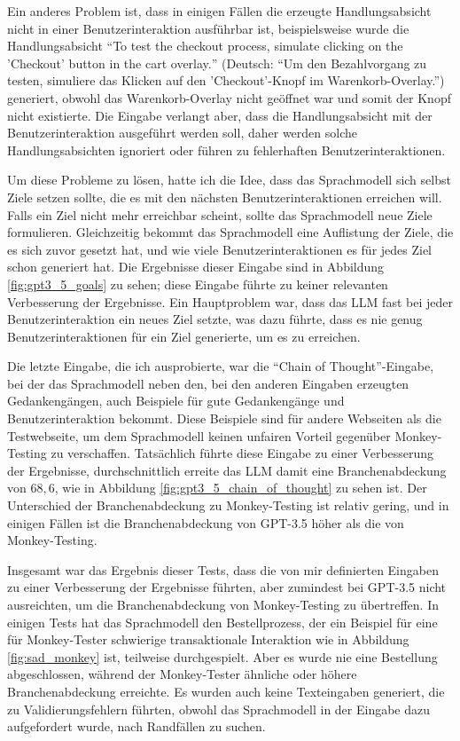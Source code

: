 Ein anderes Problem ist, dass in einigen Fällen die erzeugte Handlungsabsicht nicht in einer Benutzerinteraktion ausführbar ist, beispielsweise wurde die Handlungsabsicht \enquote{\foreignlanguage{english}{To test the checkout process, simulate clicking on the 'Checkout' button in the cart overlay.}} (Deutsch: \enquote{Um den Bezahlvorgang zu testen, simuliere das Klicken auf den 'Checkout'-Knopf im Warenkorb-Overlay.}) generiert, obwohl das Warenkorb-Overlay nicht geöffnet war und somit der Knopf nicht existierte.
Die Eingabe verlangt aber, dass die Handlungsabsicht mit der Benutzerinteraktion ausgeführt werden soll, daher werden solche Handlungsabsichten ignoriert oder führen zu fehlerhaften Benutzerinteraktionen.

Um diese Probleme zu lösen, hatte ich die Idee, dass das Sprachmodell sich selbst Ziele setzen sollte, die es mit den nächsten Benutzerinteraktionen erreichen will.
Falls ein Ziel nicht mehr erreichbar scheint, sollte das Sprachmodell neue Ziele formulieren.
Gleichzeitig bekommt das Sprachmodell eine Auflistung der Ziele, die es sich zuvor gesetzt hat, und wie viele Benutzerinteraktionen es für jedes Ziel schon generiert hat.
Die Ergebnisse dieser Eingabe sind in Abbildung \ref{fig:gpt3_5_goals} zu sehen; diese Eingabe führte zu keiner relevanten Verbesserung der Ergebnisse.
Ein Hauptproblem war, dass das LLM fast bei jeder Benutzerinteraktion ein neues Ziel setzte, was dazu führte, dass es nie genug Benutzerinteraktionen für ein Ziel generierte, um es zu erreichen.

Die letzte Eingabe, die ich ausprobierte, war die \enquote{Chain of Thought}-Eingabe, bei der das Sprachmodell neben den, bei den anderen Eingaben erzeugten Gedankengängen, auch Beispiele für gute Gedankengänge und Benutzerinteraktion bekommt.
Diese Beispiele sind für andere Webseiten als die Testwebseite, um dem Sprachmodell keinen unfairen Vorteil gegenüber Monkey-Testing zu verschaffen.
Tatsächlich führte diese Eingabe zu einer Verbesserung der Ergebnisse, durchschnittlich erreite das LLM damit eine Branchenabdeckung von $68{,}6$, wie in Abbildung \ref{fig:gpt3_5_chain_of_thought} zu sehen ist.
Der Unterschied der Branchenabdeckung zu Monkey-Testing ist relativ gering, und in einigen Fällen ist die Branchenabdeckung von GPT-3.5 höher als die von Monkey-Testing.

Insgesamt war das Ergebnis dieser Tests, dass die von mir definierten Eingaben zu einer Verbesserung der Ergebnisse führten, aber zumindest bei GPT-3.5 nicht ausreichten, um die Branchenabdeckung von Monkey-Testing zu übertreffen.
In einigen Tests hat das Sprachmodell den Bestellprozess, der ein Beispiel für eine für Monkey-Tester schwierige transaktionale Interaktion wie in Abbildung \ref{fig:sad_monkey} ist, teilweise durchgespielt.
Aber es wurde nie eine Bestellung abgeschlossen, während der Monkey-Tester ähnliche oder höhere Branchenabdeckung erreichte.
Es wurden auch keine Texteingaben generiert, die zu Validierungsfehlern führten, obwohl das Sprachmodell in der Eingabe dazu aufgefordert wurde, nach Randfällen zu suchen.


